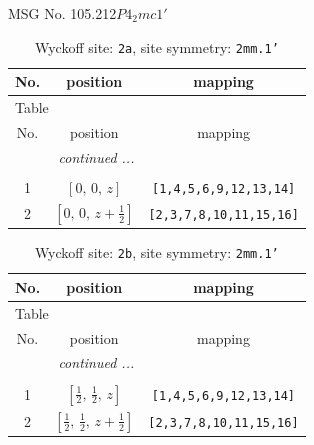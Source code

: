 \documentclass[fleqn,8pt]{jsarticle}
\begin{document}
\setcounter{MaxMatrixCols}{32}

\renewcommand{\tablename}{Table~}
\renewcommand{\figurename}{Figure~}
\begin{center}
\LARGE
MSG No. 105.212\quad$P4_{2}mc1'$
\end{center}
\renewcommand{\arraystretch}{1.2}
\begin{longtable}{ccc}
\caption{Wyckoff site: {\tt 2a}, site symmetry: {\tt 2mm.1'}}
 \\
 \hline \hline
No. & position & mapping \\ \hline \endfirsthead

\multicolumn{2}{l}{\tablename\ \thetable{}} \\
 \hline \hline
No. & position & mapping \\ \hline \endhead

 \hline \hline
\multicolumn{2}{r}{\footnotesize\it continued ...} \\ \endfoot

 \hline \hline
\multicolumn{2}{r}{} \\ \endlastfoot

1 & $\left[ 0,\, 0,\, z \right]$ & {\tt [1,4,5,6,9,12,13,14]} \\ \hline
2 & $\left[ 0,\, 0,\, z + \frac{1}{2} \right]$ & {\tt [2,3,7,8,10,11,15,16]} \\
\end{longtable}
\renewcommand{\arraystretch}{1.2}
\begin{longtable}{ccc}
\caption{Wyckoff site: {\tt 2b}, site symmetry: {\tt 2mm.1'}}
 \\
 \hline \hline
No. & position & mapping \\ \hline \endfirsthead

\multicolumn{2}{l}{\tablename\ \thetable{}} \\
 \hline \hline
No. & position & mapping \\ \hline \endhead

 \hline \hline
\multicolumn{2}{r}{\footnotesize\it continued ...} \\ \endfoot

 \hline \hline
\multicolumn{2}{r}{} \\ \endlastfoot

1 & $\left[ \frac{1}{2},\, \frac{1}{2},\, z \right]$ & {\tt [1,4,5,6,9,12,13,14]} \\ \hline
2 & $\left[ \frac{1}{2},\, \frac{1}{2},\, z + \frac{1}{2} \right]$ & {\tt [2,3,7,8,10,11,15,16]} \\
\end{longtable}
\end{document}
